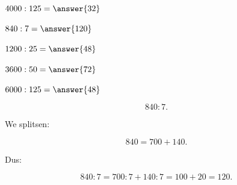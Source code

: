 \documentclass{ximera}
\begin{document}
\begin{oefening}[Basisdelingen]{\oefB\ESS}
\begin{question} \(4000:125=\answer{32}\) \end{question}

\begin{question} \(840:7=\answer{120}\) \end{question}

\begin{question} \(1200:25=\answer{48}\) \end{question}

\begin{question} \(3600:50=\answer{72}\) \end{question}

\begin{question} \(6000:125=\answer{48}\) \end{question}

\end{oefening}




\begin{voorbeeld}

\[
840:7.
\]

We splitsen:

\[
840=700+140.
\]

Dus:

\[
840:7
=
700:7+140:7
=
100+20
=
120.
\]

\end{voorbeeld}
\end{document}
